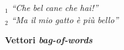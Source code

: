 \begin{frame}[t,fragile]
{{\begin{minipage}[t]{.9\textwidth}
{\begin{table}
\begin{tabular}{cc|c|c|c|c|c|c|c|c|c|c}
						\end{tabular}
					\end{table}
				}
				\renewcommand{\epigraphsize}{\scriptsize}
				\setlength{\afterepigraphskip}{0pt}
				\setlength{\beforeepigraphskip}{0pt}
				\setlength{\epigraphwidth}{0.9\textwidth}
				\epigraph{\textit{\alert{\faFile$_1$} ``Che\,\Vtextvisiblespace[1em]\,bel\,\Vtextvisiblespace\,cane\,\Vtextvisiblespace[1cm]\,che\,\Vtextvisiblespace[.5em]\,hai!''\\
				\alert{\faFile$_2$} ``Ma\,\Vtextvisiblespace[.3cm]\,il\,\Vtextvisiblespace[1cm]\,mio\,\Vtextvisiblespace[.1cm]\,gatto\,\Vtextvisiblespace[1em]\,è\,\Vtextvisiblespace[.5em]\,più\,\Vtextvisiblespace[1cm]\,bello''
				}
				}{\textbf{Vettori \textit{bag-of-words}}}
		\end{minipage}
		}	
	}
\end{frame}
%

